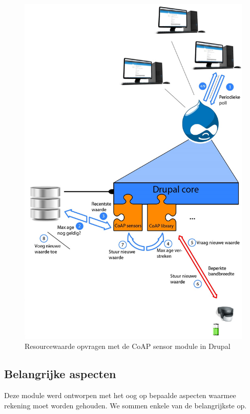 \begin{figure}
\includegraphics[width=1\textwidth]{fig/architectuur}
\caption{Resourcewaarde opvragen met de CoAP sensor module in Drupal}
\label{fig:architectuur}
\end{figure}

\subsection{Belangrijke aspecten}

Deze module werd ontworpen met het oog op bepaalde aspecten waarmee rekening moet worden gehouden. We sommen enkele van de belangrijkste op.

